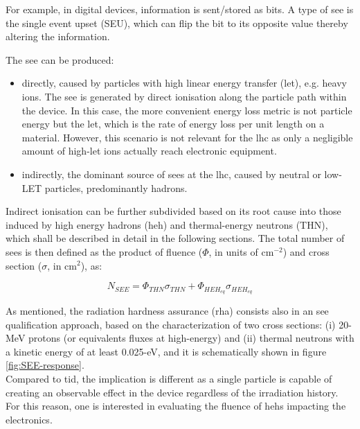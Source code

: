 \documentclass[encoding=utf8,british]{tumphthesis}
\begin{document}
For example, in digital devices, information is sent/stored as bits. A type of \acrshort{see} is the single event upset (SEU), which can flip the bit to its opposite value thereby altering the information.  

The \acrshort{see} can be produced:
\begin{itemize}
    \item directly, caused by particles with high linear energy transfer (\acrshort{let}), e.g. heavy ions. The \acrshort{see} is generated by direct ionisation along the particle path within the device. In this case, the more convenient energy loss metric is not particle energy but the \acrshort{let}, which is the rate of energy loss per unit length on a material. However, this scenario is not relevant for the \acrshort{lhc} as only a negligible amount of high-\acrshort{let} ions actually reach electronic equipment. 
    \item indirectly, the dominant source of \acrshort{see}s at the \acrshort{lhc}, caused by neutral or low-LET particles, predominantly hadrons. 
\end{itemize}

Indirect ionisation can be further subdivided based on its root cause into those induced by high energy hadrons (\acrshort{heh}) and thermal-energy neutrons (THN), which shall be described in detail in the following sections. The total number of \acrshort{see}s is then defined as the product of fluence ($\Phi$, in units of cm$^{-2}$) and cross section ($\sigma$, in cm$^2$), as:

\begin{equation}
    N_{SEE} = \Phi_{THN} \sigma_{THN} + \Phi_{HEH_{eq}} \sigma_{HEH_{eq}}
    \label{eq:n-SEE-def}
\end{equation}


As mentioned, the radiation hardness assurance (\acrshort{rha}) consists also in an \acrshort{see} qualification approach, based on the characterization of two cross sections: (i) 20-MeV protons (or equivalents fluxes at high-energy) and (ii) thermal neutrons with a kinetic energy of at least 0.025-eV, and it is schematically shown in figure \ref{fig:SEE-response}. \\

Compared to \acrshort{tid}, the implication is different as a single particle is capable of creating an observable effect in the device regardless of the irradiation history. For this reason, one is interested in evaluating the fluence of \acrshort{heh}s impacting the electronics.
\end{document}
